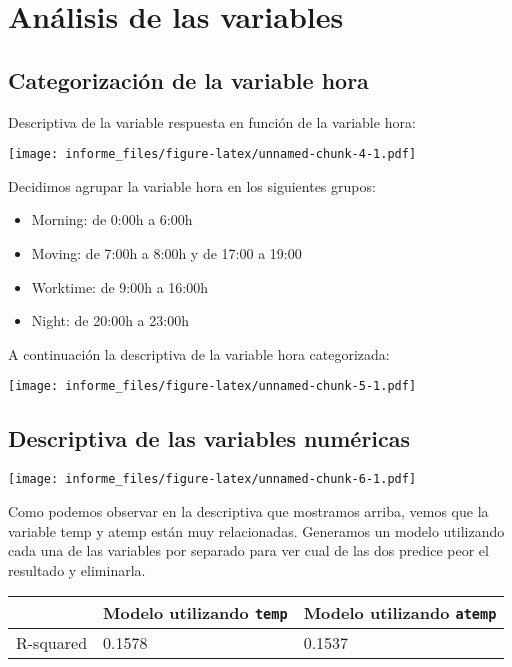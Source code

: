 \documentclass[
]{article}
\providecommand{\tightlist}{%
  \setlength{\itemsep}{0pt}\setlength{\parskip}{0pt}}
\begin{document}
\hypertarget{anuxe1lisis-de-las-variables}{%
\section{Análisis de las variables}\label{anuxe1lisis-de-las-variables}}

\hypertarget{categorizaciuxf3n-de-la-variable-hora}{%
\subsection{Categorización de la variable
hora}\label{categorizaciuxf3n-de-la-variable-hora}}

Descriptiva de la variable respuesta en función de la variable hora:

\texttt{[image: informe\_files/figure-latex/unnamed-chunk-4-1.pdf]}

Decidimos agrupar la variable hora en los siguientes grupos:

\begin{itemize}
\tightlist
\item
  Morning: de 0:00h a 6:00h
\item
  Moving: de 7:00h a 8:00h y de 17:00 a 19:00
\item
  Worktime: de 9:00h a 16:00h
\item
  Night: de 20:00h a 23:00h
\end{itemize}

A continuación la descriptiva de la variable hora categorizada:

\texttt{[image: informe\_files/figure-latex/unnamed-chunk-5-1.pdf]}

\hypertarget{descriptiva-de-las-variables-numuxe9ricas}{%
\subsection{Descriptiva de las variables
numéricas}\label{descriptiva-de-las-variables-numuxe9ricas}}

\texttt{[image: informe\_files/figure-latex/unnamed-chunk-6-1.pdf]}

Como podemos observar en la descriptiva que mostramos arriba, vemos que
la variable temp y atemp están muy relacionadas. Generamos un modelo
utilizando cada una de las variables por separado para ver cual de las
dos predice peor el resultado y eliminarla.

\begin{longtable}[]{@{}lll@{}}
\toprule
& Modelo utilizando \texttt{temp} & Modelo utilizando
\texttt{atemp}\tabularnewline
\midrule
\endhead
R-squared & 0.1578 & 0.1537\tabularnewline
\bottomrule
\end{longtable}
\end{document}
